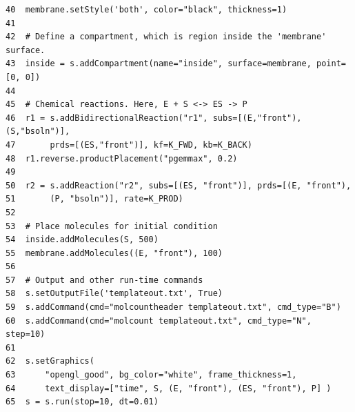 \documentclass {scrbook}
\begin{document}
\begin{lstlisting}[style=SSAPython]
40  membrane.setStyle('both', color="black", thickness=1)
41
42  # Define a compartment, which is region inside the 'membrane' surface.
43  inside = s.addCompartment(name="inside", surface=membrane, point=[0, 0])
44
45  # Chemical reactions. Here, E + S <-> ES -> P
46  r1 = s.addBidirectionalReaction("r1", subs=[(E,"front"), (S,"bsoln")],
47       prds=[(ES,"front")], kf=K_FWD, kb=K_BACK)
48  r1.reverse.productPlacement("pgemmax", 0.2)
49
50  r2 = s.addReaction("r2", subs=[(ES, "front")], prds=[(E, "front"),
51       (P, "bsoln")], rate=K_PROD)
52
53  # Place molecules for initial condition
54  inside.addMolecules(S, 500)
55  membrane.addMolecules((E, "front"), 100)
56
57  # Output and other run-time commands
58  s.setOutputFile('templateout.txt', True)
59  s.addCommand(cmd="molcountheader templateout.txt", cmd_type="B")
60  s.addCommand(cmd="molcount templateout.txt", cmd_type="N", step=10)
61
62  s.setGraphics(
63      "opengl_good", bg_color="white", frame_thickness=1,
64      text_display=["time", S, (E, "front"), (ES, "front"), P] )
65  s = s.run(stop=10, dt=0.01)
\end{lstlisting}
\end{document}
